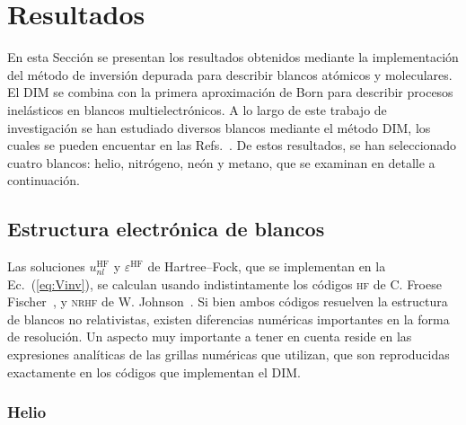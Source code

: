 \section{Resultados}
\label{sec:dimresultados}

En esta Sección se presentan los resultados obtenidos mediante la  
implementación del método de inversión depurada para describir blancos
atómicos y moleculares. El DIM se combina con la primera aproximación de 
Born para describir procesos inelásticos en blancos multielectrónicos. 
A lo largo de este trabajo de investigación se han estudiado diversos 
blancos mediante el método DIM, los cuales se pueden encuentar en las 
Refs.~\cite{Mendez:16,Mendez:19dim,Mendez:18}. De estos resultados, se 
han seleccionado cuatro blancos: helio, nitrógeno, neón y metano, que se 
examinan en detalle a continuación.

\subsection{Estructura electrónica de blancos}
\label{subsec:dimtarget}

Las soluciones $u_{nl}^{\mathrm{HF}}$ y $\varepsilon^{\mathrm{HF}}$ de 
Hartree--Fock, que se implementan en la Ec.~(\ref{eq:Vinv}), se calculan 
usando indistintamente los códigos \textsc{hf} de C. Froese 
Fischer~\cite{FroeseFischer:97}, y \textsc{nrhf} de W. 
Johnson~\cite{Johnson:07}. Si bien ambos códigos resuelven la estructura
de blancos no relativistas, existen diferencias numéricas importantes en 
la forma de resolución. Un aspecto muy importante a tener en cuenta 
reside en las expresiones analíticas de las grillas numéricas que 
utilizan, que son reproducidas exactamente en los códigos que 
implementan el DIM. 

\subsubsection{Helio}


